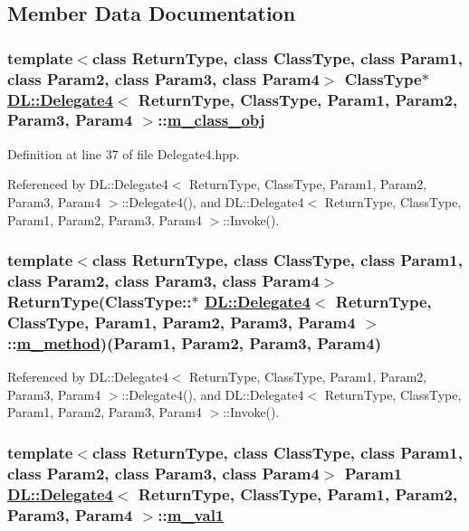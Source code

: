 \subsection{Member Data Documentation}
\hypertarget{classDL_1_1Delegate4_r0}{
\subsubsection[m\_\-class\_\-obj]{\setlength{\rightskip}{0pt plus 5cm}template$<$class Return\-Type, class Class\-Type, class Param1, class Param2, class Param3, class Param4$>$ Class\-Type$\ast$ \hyperlink{classDL_1_1Delegate4}{DL::Delegate4}$<$ Return\-Type, Class\-Type, Param1, Param2, Param3, Param4 $>$::\hyperlink{classDL_1_1Delegate4_r0}{m\_\-class\_\-obj}}}
\label{classDL_1_1Delegate4_r0}




Definition at line 37 of file Delegate4.hpp.

Referenced by DL::Delegate4$<$ Return\-Type, Class\-Type, Param1, Param2, Param3, Param4 $>$::Delegate4(), and DL::Delegate4$<$ Return\-Type, Class\-Type, Param1, Param2, Param3, Param4 $>$::Invoke().\hypertarget{classDL_1_1Delegate4_r1}{
\subsubsection[m\_\-method]{\setlength{\rightskip}{0pt plus 5cm}template$<$class Return\-Type, class Class\-Type, class Param1, class Param2, class Param3, class Param4$>$ Return\-Type(Class\-Type::$\ast$ \hyperlink{classDL_1_1Delegate4}{DL::Delegate4}$<$ Return\-Type, Class\-Type, Param1, Param2, Param3, Param4 $>$::\hyperlink{classDL_1_1Delegate4_r1}{m\_\-method})(Param1, Param2, Param3, Param4)}}
\label{classDL_1_1Delegate4_r1}




Referenced by DL::Delegate4$<$ Return\-Type, Class\-Type, Param1, Param2, Param3, Param4 $>$::Delegate4(), and DL::Delegate4$<$ Return\-Type, Class\-Type, Param1, Param2, Param3, Param4 $>$::Invoke().\hypertarget{classDL_1_1Delegate4_r2}{
\subsubsection[m\_\-val1]{\setlength{\rightskip}{0pt plus 5cm}template$<$class Return\-Type, class Class\-Type, class Param1, class Param2, class Param3, class Param4$>$ Param1 \hyperlink{classDL_1_1Delegate4}{DL::Delegate4}$<$ Return\-Type, Class\-Type, Param1, Param2, Param3, Param4 $>$::\hyperlink{classDL_1_1Delegate4_r2}{m\_\-val1}}}
\label{classDL_1_1Delegate4_r2}




